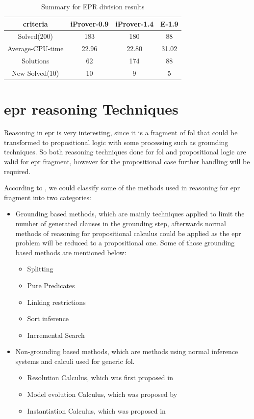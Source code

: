 \begin{table}[H]
	\centering
	\begin{tabular}{||c | c | c | c||} 
 		\hline
		criteria & iProver-0.9 & iProver-1.4 & E-1.9 \\ %
 		\hline\hline
		Solved(200) & 183 & 180 & 88 \\
		Average-CPU-time & 22.96 & 22.80 & 31.02 \\
		Solutions & 62 & 174 & 88 \\
		New-Solved(10) & 10 & 9 & 5 \\ [1ex] 
 		\hline
		\end{tabular}
	\caption{Summary for EPR division results}
	\label{table:epr_casc_results}
\end{table}




\section{\ac{epr} reasoning Techniques}
Reasoning in \ac{epr} is very interesting, since it is a fragment of \ac{fol} that could be transformed to propositional logic with some processing such as grounding techniques. So both reasoning techniques done for \ac{fol} and propositional logic are valid for \ac{epr} fragment, however for the propositional case further handling will be required.


According to \cite{EPR_PHD}, we could classify some of the methods used in reasoning for \ac{epr} fragment into two categories:
	\begin{itemize}
		\item Grounding based methods, which are mainly techniques applied to limit the number of generated clauses in the grounding step, afterwards normal methods of reasoning for propositional calculus could be applied as the \ac{epr} problem will be reduced to a propositional one. Some of those grounding based methods are mentioned below: 
			\begin{itemize}
				\item Splitting
				\item Pure Predicates
				\item Linking restrictions
				\item Sort inference
				\item Incremental Search			
			\end{itemize}
		\item Non-grounding based methods, which are methods using normal inference systems and calculi used for generic \ac{fol}.
			\begin{itemize}
				\item Resolution Calculus, which was first proposed in \cite{RES_65}
				\item Model evolution Calculus, which was proposed by \cite{MOD03}  
				\item Instantiation Calculus, which was proposed in \cite{INST03}
			\end{itemize} 
	\end{itemize}		


